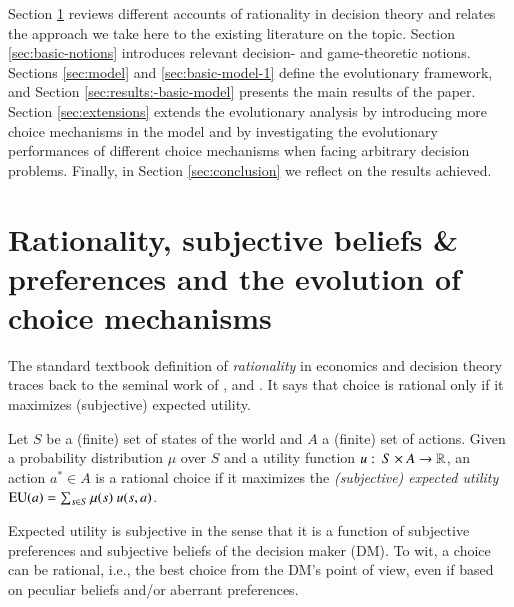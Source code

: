 \documentclass[fleqn,reqno,11pt]{article}
\begin{document}
Section \ref{sec:rati--subj} reviews different accounts of rationality in decision theory and
relates the approach we take here to the existing literature on the topic. Section
\ref{sec:basic-notions} introduces relevant decision- and game-theoretic notions. Sections
\ref{sec:model} and \ref{sec:basic-model-1} define the evolutionary framework, and Section
\ref{sec:results:-basic-model} presents the main results of the paper. Section
\ref{sec:extensions} extends the evolutionary analysis by introducing more choice mechanisms in
the model and by investigating the evolutionary performances of different choice mechanisms
when facing arbitrary decision problems. Finally, in Section \ref{sec:conclusion} we reflect on
the results achieved.



\section{Rationality, subjective beliefs \& preferences and the evolution of choice mechanisms}
\label{sec:rati--subj}

The standard textbook definition of \textit{rationality} in economics and decision theory
traces back to the seminal work of \citet{deFinetti37}, \citet{Neumannvon-NeumannMorgenstern1944:Theory-of-Games}
and \citet{Savage1954:The-Foundations}. It says that choice is rational only if it maximizes
(subjective) expected utility.

\begin{definition}
  \label{def:rationality}
  Let $S$ be a (finite) set of states of the world and $A$ a (finite) set of actions. Given a
  probability distribution $\mu$ over $S$ and a utility function
  $u \thinspace \colon \thinspace S \times A \rightarrow \mathbb{R} $, an action $a^* \in A$ is a rational choice
 if it maximizes the \emph{(subjective) expected utility} 
  $\EU(a) = \sum_{s \in S} \mu(s) \ u(s, a)$.
\end{definition}

\noindent Expected utility is subjective in the sense that it is a function of subjective
preferences and subjective beliefs of the decision maker (DM). To wit, a choice can be
rational, i.e., the best choice from the DM's point of view, even if based on peculiar beliefs
and/or aberrant preferences. %
\end{document}
